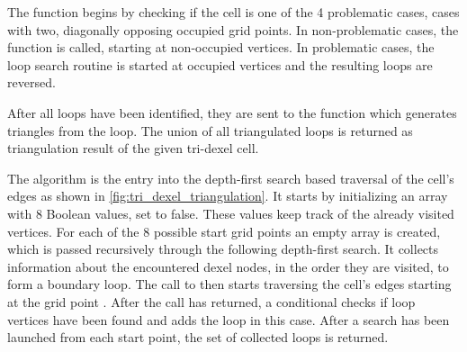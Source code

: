 %
The  function begins by checking if the cell is one of the 4 problematic cases, \ie cases with two, diagonally opposing occupied grid points.
In non-problematic cases, the  function is called, starting at non-occupied vertices.
In problematic cases, the loop search routine is started at occupied vertices and the resulting loops are reversed.

After all loops have been identified, they are sent to the  function which generates triangles from the loop.
The union of all triangulated loops is returned as triangulation result of the given tri-dexel cell.

The  algorithm is the entry into the depth-first search based traversal of the cell's edges as shown in \cref{fig:tri_dexel_triangulation}.
It starts by initializing an array with 8 Boolean values, set to false.
These values keep track of the already visited vertices.
For each of the 8 possible start grid points an empty array  is created, which is passed recursively through the following depth-first search.
It collects information about the encountered dexel nodes, in the order they are visited, to form a boundary loop.
The call to  then starts traversing the cell's edges starting at the grid point .
After the call has returned, a conditional checks if loop vertices have been found and adds the loop in this case.
After a search has been launched from each start point, the set of collected loops is returned.

